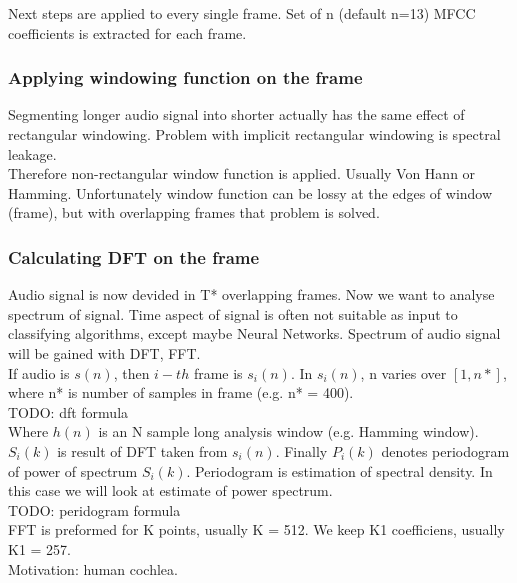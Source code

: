 \documentclass{article}
\begin{document}
Next steps are applied to every single frame. Set of n (default n=13) MFCC coefficients is extracted for each frame.

\subsubsection{Applying windowing function on the frame}
Segmenting longer audio signal into shorter actually has the same effect of rectangular windowing. Problem with implicit rectangular windowing is spectral leakage.\\
Therefore non-rectangular window function is applied. Usually Von Hann or Hamming. Unfortunately window function can be lossy at the edges of window (frame), but with overlapping frames that problem is solved.

\subsubsection{Calculating DFT on the frame}
Audio signal is now devided in T* overlapping frames. Now we want to analyse spectrum of signal. Time aspect of signal is often not suitable as input to classifying algorithms, except maybe Neural Networks. Spectrum of audio signal will be gained with DFT, FFT.\\
If audio is $s(n)$, then $i-th$ frame is $s_i(n)$. In $s_i(n)$, n varies over $[1,n*]$, where n* is number of samples in frame (e.g. n* = 400).\\
TODO: dft formula \\
Where $h(n)$ is an N sample long analysis window (e.g. Hamming window). \\
$S_i(k)$ is result of DFT taken from $s_i(n)$. Finally $P_i(k)$ denotes periodogram of power of spectrum $S_i(k)$. Periodogram is estimation of spectral density. In this case we will look at estimate of power spectrum.\\
TODO: peridogram formula \\
FFT is preformed for K points, usually K = 512. We keep K1 coefficiens, usually K1 = 257.\\
Motivation: human cochlea.\\
\end{document}
